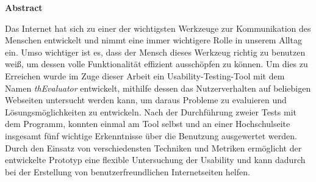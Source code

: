 \vspace*{2cm}

\begin{center}
    \textbf{Abstract}
\end{center}

\vspace*{1cm}

\noindent Das Internet hat sich zu einer der wichtigsten Werkzeuge zur Kommunikation des Menschen entwickelt und nimmt eine immer wichtigere Rolle in unserem Alltag ein. Umso wichtiger ist es, dass der Mensch dieses Werkzeug richtig zu benutzen weiß, um dessen volle Funktionalität effizient ausschöpfen zu können. Um dies zu Erreichen wurde im Zuge dieser Arbeit ein Usability-Testing-Tool mit dem Namen \textit{thEvaluator} entwickelt, mithilfe dessen das Nutzerverhalten auf beliebigen Webseiten untersucht werden kann, um daraus Probleme zu evaluieren und Lösungsmöglichkeiten zu entwickeln. Nach der Durchführung zweier Tests mit dem Programm, konnten einmal am Tool selbst und an einer Hochschulseite insgesamt fünf wichtige Erkenntnisse über die Benutzung ausgewertet werden. Durch den Einsatz von verschiedensten Techniken und Metriken ermöglicht der entwickelte Prototyp eine flexible Untersuchung der Usability und kann dadurch bei der Erstellung von benutzerfreundlichen Internetseiten helfen.
